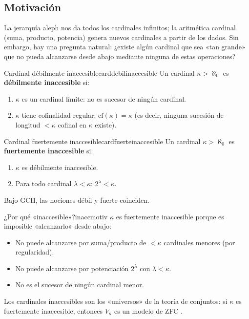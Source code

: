\subsection{Motivación}

La jerarquía aleph nos da todos los cardinales infinitos; la aritmética cardinal (suma, producto, potencia) genera nuevos cardinales a partir de los dados. Sin embargo, hay una pregunta natural: ¿existe algún cardinal que sea «tan grande» que no pueda alcanzarse desde abajo mediante ninguna de estas operaciones?

\begin{definicion}{Cardinal débilmente inaccesible}{carddebilinaccesible}
Un cardinal $\kappa > \aleph_0$ es \textbf{débilmente inaccesible} si:
\begin{enumerate}[leftmargin=2em, label=(\roman*)]
  \item $\kappa$ es un cardinal límite: no es sucesor de ningún cardinal.
  \item $\kappa$ tiene cofinalidad regular: $\mathrm{cf}(\kappa) = \kappa$ (es decir, ninguna sucesión de longitud $< \kappa$ cofinal en $\kappa$ existe).
\end{enumerate}
\end{definicion}

\begin{definicion}{Cardinal fuertemente inaccesible}{cardfuerteinaccesible}
Un cardinal $\kappa > \aleph_0$ es \textbf{fuertemente inaccesible} si:
\begin{enumerate}[leftmargin=2em, label=(\roman*)]
  \item $\kappa$ es débilmente inaccesible.
  \item Para todo cardinal $\lambda < \kappa$: $2^\lambda < \kappa$.
\end{enumerate}
Bajo GCH, las nociones débil y fuerte coinciden.
\end{definicion}

\begin{observacion}{¿Por qué «inaccesible»?}{inaccmotiv}
$\kappa$ es fuertemente inaccesible porque es imposible «alcanzarlo» desde abajo:
\begin{itemize}[leftmargin=2em]
  \item No puede alcanzarse por suma/producto de $< \kappa$ cardinales menores (por regularidad).
  \item No puede alcanzarse por potenciación $2^\lambda$ con $\lambda < \kappa$.
  \item No es el sucesor de ningún cardinal menor.
\end{itemize}
Los cardinales inaccesibles son los «universos» de la teoría de conjuntos: si $\kappa$ es fuertemente inaccesible, entonces $V_\kappa$ es un modelo de ZFC \cite{kunen2011, kanamori2003}.
\end{observacion}

